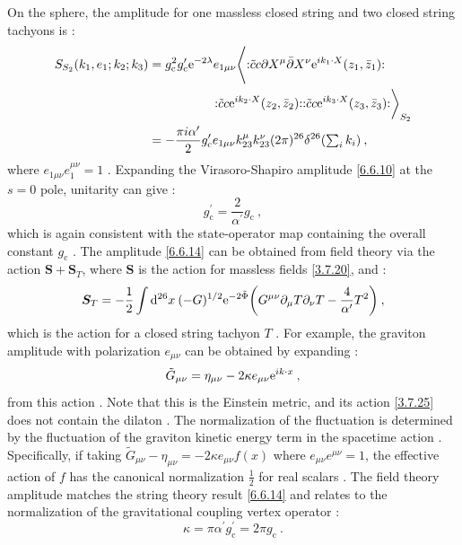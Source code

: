 On the sphere, the amplitude for one massless closed string and two closed string tachyons is :
\begin{align}
	S_{S_{2}}(k_{1}, e_{1} ; k_{2} ; k_{3}) &= g_{\mathrm{c}}^{2} g_{\mathrm{c}}^{\prime} 
	\mathrm{e}^{-2 \lambda} e_{1 \mu \nu} \Biggl\langle: \mathrel{\tilde{c} c \partial X^{\mu} \bar{\partial} X^{\nu} 
		\mathrm{e}^{i k_{1} \cdot X}(z_{1}, \bar{z}_{1})}: \nonumber \\
	&\qquad \qquad \quad : \mathrel{\tilde{c} c \mathrm{e}^{i k_{2} \cdot X}(z_{2}, \bar{z}_{2})}:
	: \mathrel{\tilde{c} c \mathrm{e}^{i k_{3} \cdot X}(z_{3}, \bar{z}_{3})}: \biggr\rangle_{S_{2}}  \nonumber \\
	& =-\frac{\pi i \alpha^{\prime}}{2} g_{\mathrm{c}}^{\prime} e_{1 \mu \nu} k_{23}^{\mu} k_{23}^{\nu}
	(2 \pi)^{26} \delta^{26}({\textstyle\sum_{i} k_{i}}) \:, \label{6.6.14}
\end{align}
where $e_{1 \mu \nu} e_{1}^{\mu \nu}=1$ . Expanding the Virasoro-Shapiro amplitude \eqref{6.6.10} at the $s=0$ pole, unitarity can give :
\begin{equation}
	g_{\mathrm{c}}^{\prime}=\frac{2}{\alpha^{\prime}} g_{\mathrm{c}} \:, \label{6.6.15}
\end{equation}
which is again consistent with the state-operator map containing the overall constant $g_{\mathrm{c}}$ . The amplitude \eqref{6.6.14} can be obtained from field theory via the action $\bm{S}+\bm{S}_{T}$, where $\bm{S}$ is the action for massless fields \eqref{3.7.20}, and :
\begin{equation}
	\bm{S}_{T}=-\frac{1}{2} \int \mathrm{d}^{26} x\: (-G)^{1 / 2} \mathrm{e}^{-2 \tilde{\Phi}}
	\biggl(G^{\mu \nu} \partial_{\mu} T \partial_{\nu} T-\frac{4}{\alpha^{\prime}} T^{2} \biggr) \:, \label{6.6.16}
\end{equation}
which is the action for a closed string tachyon $T$ . For example, the graviton amplitude with polarization $e_{\mu \nu}$ can be obtained by expanding :
\begin{equation}
	\tilde{G}_{\mu \nu}=\eta_{\mu \nu}-2 \kappa e_{\mu \nu} \mathrm{e}^{i k \cdot x} \:, \label{6.6.17}
\end{equation}
from this action . Note that this is the Einstein metric, and its action \eqref{3.7.25} does not contain the dilaton . The normalization of the fluctuation is determined by the fluctuation of the graviton kinetic energy term in the spacetime action . Specifically, if taking $\tilde{G}_{\mu \nu}-\eta_{\mu \nu}=-2 \kappa e_{\mu \nu} f(x)$ where $e_{\mu \nu} e^{\mu \nu}=1$, the effective action of $f$ has the canonical normalization $\frac{1}{2}$ for real scalars . The field theory amplitude matches the string theory result \eqref{6.6.14} and relates to the normalization of the gravitational coupling vertex operator :
\begin{equation}
	\kappa=\pi \alpha^{\prime} g_{\mathrm{c}}^{\prime}=2 \pi g_{\mathrm{c}} \:. \label{6.6.18}
\end{equation}

